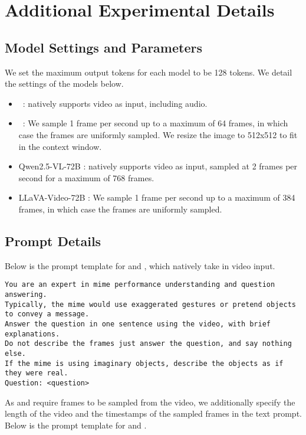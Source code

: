 \section{Additional Experimental Details}

\subsection{Model Settings and Parameters}\label{app:model_settings}
We set the maximum output tokens for each model to be 128 tokens. We detail the settings of the models below. 
\begin{itemize}[noitemsep,topsep=0pt,nosep,leftmargin=*,parsep=0pt,partopsep=0pt]
    \item \gemini~\citep{team2024gemini}: natively supports video as input, including audio. 
    \item \gpt~\citep{achiam2023gpt}: We sample 1 frame per second up to a maximum of 64 frames, in which case the frames are uniformly sampled. We resize the image to 512x512 to fit in the context window.
    \item Qwen2.5-VL-72B \citep{qwen2.5-VL}: natively supports video as input, sampled at 2 frames per second for a maximum of 768 frames.
    \item LLaVA-Video-72B \citep{zhangVideoInstructionTuning2024}: We sample 1 frame per second up to a maximum of 384 frames, in which case the frames are uniformly sampled.
\end{itemize}

\subsection{Prompt Details}\label{app:prompt}

Below is the prompt template for {\gemini} and {\qwen}, which natively take in video input.
\begin{lstlisting}[style=markdownstyle]
You are an expert in mime performance understanding and question answering. 
Typically, the mime would use exaggerated gestures or pretend objects to convey a message.
Answer the question in one sentence using the video, with brief explanations. 
Do not describe the frames just answer the question, and say nothing else.
If the mime is using imaginary objects, describe the objects as if they were real.
Question: <question>
\end{lstlisting}

As {\gpt} and {\llava} require frames to be sampled from the video, we additionally specify the length of the video and the timestamps of the sampled frames in the text prompt. Below is the prompt template for {\gpt} and {\llava}.

